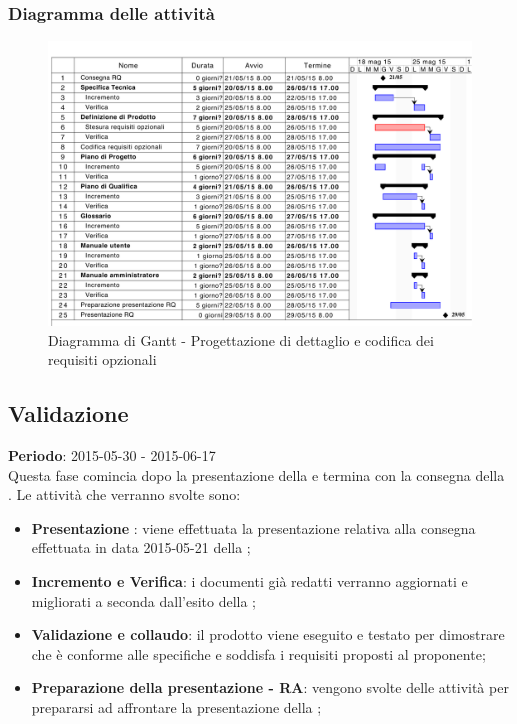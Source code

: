		\subsubsection{Diagramma delle attività} %
		\label{ssub:diagramma_delle_attivita}
			\begin{figure}[htbp]
				\centering
				\centerline{\includegraphics[scale=0.7]{images/d_attivita_prog_dett_cod_opz.pdf}}
				\caption{Diagramma di Gantt - Progettazione di dettaglio e codifica dei requisiti opzionali}
				\label{fig:gantt_prog_dett_cod_requisiti_opzionali}				
			\end{figure}
	
	\subsection{Validazione} %
	\label{sub:validazione}
	\textbf{Periodo}:  2015-05-30 - 2015-06-17 \\
	Questa fase comincia dopo la presentazione della \RQ{} e termina con la consegna della \RA.
	Le attività che verranno svolte sono:
		\begin{itemize}
			\item \textbf{Presentazione \RQ}: viene effettuata la presentazione relativa alla consegna effettuata in data 2015-05-21 della \RQ;
			\item \textbf{Incremento e Verifica}: i documenti già redatti verranno aggiornati e migliorati a seconda dall'esito della \RQ;
			\item \textbf{Validazione e collaudo}: il prodotto viene eseguito e testato per dimostrare che è conforme alle specifiche e soddisfa i requisiti proposti al proponente;
			\item \textbf{Preparazione della presentazione - RA}: vengono svolte delle attività per prepararsi ad affrontare la presentazione della \RA;
		\end{itemize}
		
